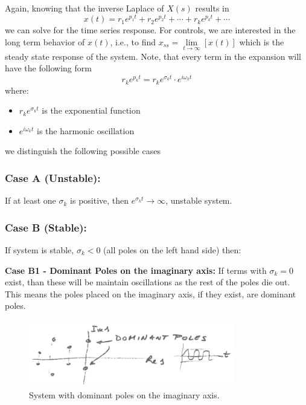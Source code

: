 \documentclass[12pt,letter]{article}
\begin{document}
Again, knowing that the inverse Laplace of $X(s)$ results in
\begin{equation}
x(t) = r_1 e^{p_1t} + r_2 e^{p_2t} + \cdots + r_k e^{p_kt} + \cdots
\end{equation}
we can solve for the time series response. For controls, we are interested in the long term behavior of $x(t)$, i.e., to find $x_{ss} =  \lim\limits_{t\rightarrow \infty} [x(t)]$ which is the steady state response of the system. Note, that every term in the expansion will have the following form
\begin{equation}
r_k e^{p_kt} = r_ke^{\sigma_k t} \cdot e^{i \omega_k t}
\end{equation}
where: 
\begin{itemize}[noitemsep,topsep=0pt]
\item $r_ke^{\sigma_k t}$ is the exponential function
\item $e^{i \omega_k t}$ is the harmonic oscillation
\end{itemize}
we distinguish the following possible cases

\subsubsection{Case A (Unstable):}

If at least one $\sigma_k$ is positive, then $e^{\sigma_k t} \rightarrow \infty$, unstable system. 

\subsubsection{Case B  (Stable):} 

If system is stable, $\sigma_k<0$ (all poles on the left hand side) then:

\noindent \textbf{Case B1 - Dominant Poles on the imaginary axis:}  If terms with $\sigma_k=0$ exist, than these will be maintain oscillations as the rest of the poles die out. This means the poles placed on the imaginary axis, if they exist, are dominant poles. 


\begin{figure}[H]
	\centering
	\includegraphics[width=0.8\textwidth]{../figures/dominant_poles_B1.png}
	\caption{System with dominant poles on the imaginary axis.}
\end{figure}
\end{document}
